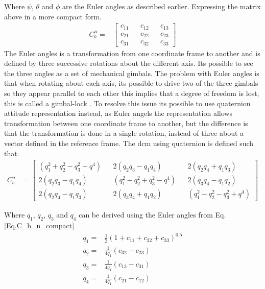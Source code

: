 Where $\psi$, $\theta$ and $\phi$ are the Euler angles as described earlier. Expressing the matrix above in a more compact form.
\begin{align}
C_b^n = &
\begin{bmatrix}
c_{11} && c_{12} && c_{13}\\
c_{21} && c_{22} && c_{23} \\
c_{31} && c_{32} && c_{33}
\end{bmatrix}
\label{Eq.C_b_n_compact}
\end{align}
The Euler angles is a transformation from one coordinate frame to another and is defined by three successive rotations about the different axis. Its possible to see the three angles as a set of mechanical gimbals. 
The problem with Euler angles is that when rotating about each axis, its possible to drive two of the three gimbals so they appear parallel to each other this implies that a degree of freedom is lost, this is called a gimbal-lock \cite{nonlinear}. To resolve this issue its possible to use quaternion attitude representation instead, as Euler angels the representation allows transformation between one coordinate frame to another, but the difference is that the transformation is done in a single rotation, instead of three about a vector defined in the reference frame. The \gls{dcm} using quaternion is defined such that\cite{nonlinear}.
\begin{align}
C_b^n & =
\begin{bmatrix}
(q_1^2 + q_2^2 - q_3^2-q^4) && 2(q_2q_3 - q_1q_4) && 2(q_2q_4 + q_1q_3) \\
2(q_2q_3 - q_1q_4) && (q_1^2 - q_2^2 + q_3^2-q^4) && 2(q_3q_4 - q_1q_2) \\
2(q_2q_4 - q_1q_3) && 2(q_3q_4 + q_1q_2) && (q_1^2 - q_2^2 - q_3^2+q^4)
\end{bmatrix}
\end{align}

Where $q_1$, $q_2$, $q_3$ and $q_4$ can be derived using the Euler angles from Eq. \eqref{Eq.C_b_n_compact}
\begin{align*}
q_1 =& \frac{1}{2}(1+c_{11} + c_{22} + c_{33})^{0.5} \\
q_2 =& \frac{1}{4q_1}(c_{32} - c_{23})\\
q_3 =& \frac{1}{4q_1}(c_{13} - c_{31})\\
q_4 =& \frac{1}{4q_1}(c_{21} - c_{12})\\
\end{align*}


